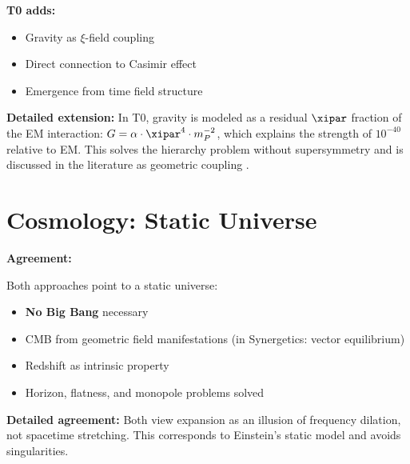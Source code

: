 	\textbf{T0 adds:}
	\begin{itemize}
		\item Gravity as $\xi$-field coupling
		\item Direct connection to Casimir effect
		\item Emergence from time field structure
	\end{itemize}
	
	\textbf{Detailed extension:} In T0, gravity is modeled as a residual $\xipar$ fraction of the EM interaction: $G = \alpha \cdot \xipar^4 \cdot m_P^{-2}$, which explains the strength of $10^{-40}$ relative to EM. This solves the hierarchy problem without supersymmetry and is discussed in the literature as geometric coupling \cite{weinberg_1989}.
	
	\section{Cosmology: Static Universe}
	
	\begin{gemeinsam}
		\textbf{Agreement:}
		
		Both approaches point to a static universe:
		\begin{itemize}
			\item \textbf{No Big Bang} necessary
			\item CMB from geometric field manifestations (in Synergetics: vector equilibrium)
			\item Redshift as intrinsic property
			\item Horizon, flatness, and monopole problems solved
		\end{itemize}
		
		\textbf{Detailed agreement:} Both view expansion as an illusion of frequency dilation, not spacetime stretching. This corresponds to Einstein's static model \cite{einstein_1917} and avoids singularities.
	\end{gemeinsam}
	
